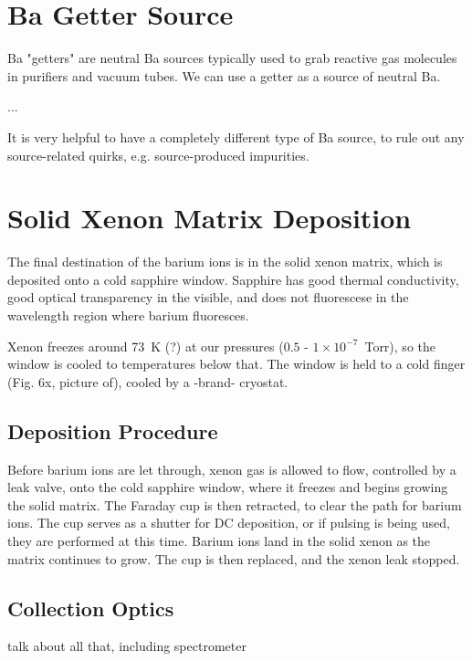 \section{Ba Getter Source}

Ba "getters" are neutral Ba sources typically used to grab reactive gas molecules in purifiers and vacuum tubes.  We can use a getter as a source of neutral Ba.

...

It is very helpful to have a completely different type of Ba source, to rule out any source-related quirks, e.g. source-produced impurities.

\section{Solid Xenon Matrix Deposition}

The final destination of the barium ions is in the solid xenon matrix, which is deposited onto a cold sapphire window.  Sapphire has good thermal conductivity, good optical transparency in the visible, and does not fluorescese in the wavelength region where barium fluoresces.  

Xenon freezes around 73~K (?) at our pressures ($0.5$ - $1 \times 10^{-7}$~Torr), so the window is cooled to temperatures below that.  The window is held to a cold finger (Fig. 6x, picture of), cooled by a -brand- cryostat. %

\subsection{Deposition Procedure}

Before barium ions are let through, xenon gas is allowed to flow, controlled by a leak valve, onto the cold sapphire window, where it freezes and begins growing the solid matrix.  The Faraday cup is then retracted, to clear the path for barium ions.  The cup serves as a shutter for DC deposition, or if pulsing is being used, they are performed at this time.  Barium ions land in the solid xenon as the matrix continues to grow.  The cup is then replaced, and the xenon leak stopped.

\subsection{Collection Optics}

talk about all that, including spectrometer
